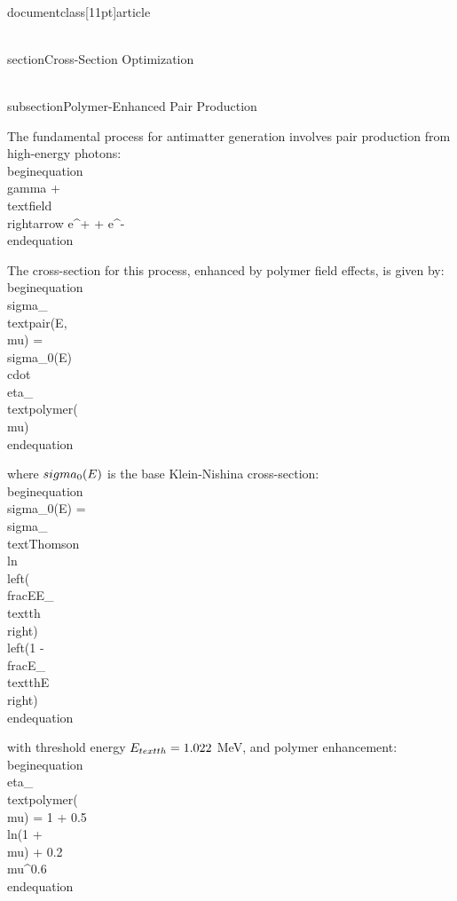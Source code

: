 \\documentclass[11pt]{article}
\begin{document}
\\section{Cross-Section Optimization}

\\subsection{Polymer-Enhanced Pair Production}

The fundamental process for antimatter generation involves pair production from high-energy photons:
\\begin{equation}
\\gamma + \\text{field} \\rightarrow e^+ + e^-
\\end{equation}

The cross-section for this process, enhanced by polymer field effects, is given by:
\\begin{equation}
\\sigma_{\\text{pair}}(E, \\mu) = \\sigma_0(E) \\cdot \\eta_{\\text{polymer}}(\\mu)
\\end{equation}

where $\\sigma_0(E)$ is the base Klein-Nishina cross-section:
\\begin{equation}
\\sigma_0(E) = \\sigma_{\\text{Thomson}} \\ln\\left(\\frac{E}{E_{\\text{th}}}\\right) \\left(1 - \\frac{E_{\\text{th}}}{E}\\right)
\\end{equation}

with threshold energy $E_{\\text{th}} = 1.022$ MeV, and polymer enhancement:
\\begin{equation}
\\eta_{\\text{polymer}}(\\mu) = 1 + 0.5 \\ln(1 + \\mu) + 0.2 \\mu^{0.6}
\\end{equation}
\end{document}
